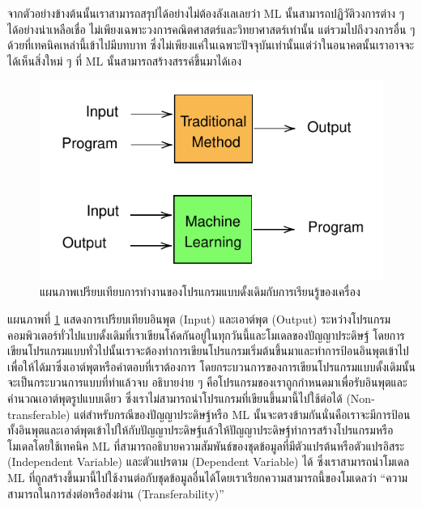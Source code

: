 จากตัวอย่างข้างต้นนั้นเราสามารถสรุปได้อย่างไม่ต้องลังเลเลยว่า ML นั้นสามารถปฏิวัติวงการต่าง ๆ ได้อย่างน่าเหลือเชื่อ ไม่เพียงเฉพาะวงการคณิตศาสตร์และวิทยาศาสตร์เท่านั้น แต่รวมไปถึงวงการอื่น ๆ ด้วยที่เทคนิคเหล่านี้เข้าไปมีบทบาท ซึ่งไม่เพียงแค่ในเฉพาะปัจจุบันเท่านั้นแต่ว่าในอนาคตนั้นเราอาจจะได้เห็นสิ่งใหม่ ๆ ที่ ML นั้นสามารถสร้างสรรค์ขึ้นมาได้เอง

\begin{figure}[H]
    \centering
    \includegraphics[scale=0.9]{fig/ML-concept.pdf}
    \caption{แผนภาพเปรียบเทียบการทำงานของโปรแกรมแบบดั้งเดิมกับการเรียนรู้ของเครื่อง}
    \label{fig:ml_paradigm}
\end{figure}

แผนภาพที่ \ref{fig:ml_paradigm} แสดงการเปรียบเทียบอินพุต (Input) และเอาต์พุต (Output) ระหว่างโปรแกรมคอมพิวเตอร์ทั่วไปแบบดั้งเดิมที่เราเขียนโค้ดกันอยู่ในทุกวันนี้และโมเดลของปัญญาประดิษฐ์ โดยการเขียนโปรแกรมแบบทั่วไปนั้นเราจะต้องทำการเขียนโปรแกรมเริ่มต้นขึ้นมาและทำการป้อนอินพุตเข้าไปเพื่อให้ได้มาซึ่งเอาต์พุตหรือคำตอบที่เราต้องการ โดยกระบวนการของการเขียนโปรแกรมแบบดั้งเดิมนั้นจะเป็นกระบวนการแบบที่ทำแล้วจบ อธิบายง่าย ๆ คือโปรแกรมของเราถูกกำหนดมาเพื่อรับอินพุตและคำนวณเอาต์พุตรูปแบบเดียว ซึ่งเราไม่สามารถนำโปรแกรมที่เขียนขึ้นมานี้ไปใช้ต่อได้ (Non-transferable) แต่สำหรับกรณีของปัญญาประดิษฐ์หรือ ML นั้นจะตรงข้ามกันนั่นคือเราจะมีการป้อนทั้งอินพุตและเอาต์พุตเข้าไปให้กับปัญญาประดิษฐ์แล้วให้ปัญญาประดิษฐ์ทำการสร้างโปรแกรมหรือโมเดลโดยใช้เทคนิค ML ที่สามารถอธิบายความสัมพันธ์ของชุดข้อมูลที่มีตัวแปรต้นหรือตัวแปรอิสระ (Independent Variable) และตัวแปรตาม (Dependent Variable) ได้ ซึ่งเราสามารถนำโมเดล ML ที่ถูกสร้างขึ้นมานี้ไปใช้งานต่อกับชุดข้อมูลอื่นได้โดยเราเรียกความสามารถนี้ของโมเดลว่า \enquote{ความสามารถในการส่งต่อหรือส่งผ่าน (Transferability)}


